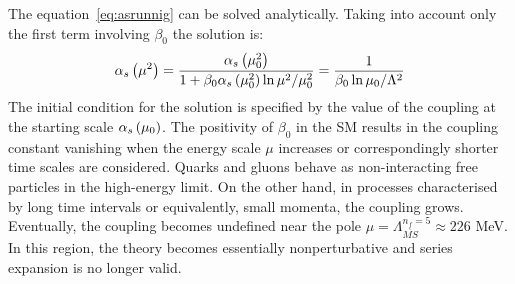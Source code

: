 The equation~\ref{eq:asrunnig} can be solved analytically. Taking into account only the first term involving $\beta_0$ the solution is:
\begin{equation}
 \mbox{$\alpha_{s}$}\left(\mu^2\right) = \dfrac{ \mbox{$\alpha_{s}$}\left(\mu_0^2\right) }{1+\beta_0\mbox{$\alpha_{s}$}\left(\mu_0^2\right)\ln{\mu^2/\mu_0^2}} = \dfrac{1}{\beta_0\ln{\mu_0/\Lambda^2}}
\label{eq:asrunnigsolution}
\end{equation}
The initial condition for the solution is specified by the value of the coupling at the starting scale $\mbox{$\alpha_{s}$}\left(\mu_0\right)$. The positivity of $\beta_0$ in the SM results in the coupling constant vanishing when the energy scale $\mu$ increases or correspondingly shorter time scales are considered. Quarks and gluons behave as non-interacting free particles in the high-energy limit. On the other hand, in processes characterised by long time intervals or equivalently, small momenta, the coupling grows. Eventually, the coupling becomes undefined near the pole $\mu = \Lambda_{\overline{MS}}^{n_f=5} \approx 226$ MeV. In this region, the theory becomes essentially nonperturbative and series expansion is no longer valid. 

